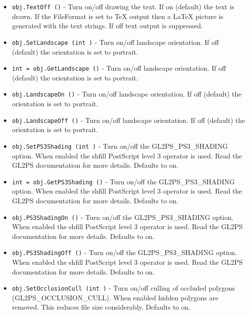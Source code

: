 \begin{itemize}
\item  \verb|obj.TextOff ()| -  Turn on/off drawing the text.  If on (default) the text is drawn.
 If the FileFormat is set to TeX output then a LaTeX picture is
 generated with the text strings.  If off text output is
 suppressed.

\item  \verb|obj.SetLandscape (int )| -  Turn on/off landscape orientation.  If off (default) the
 orientation is set to portrait.

\item  \verb|int = obj.GetLandscape ()| -  Turn on/off landscape orientation.  If off (default) the
 orientation is set to portrait.

\item  \verb|obj.LandscapeOn ()| -  Turn on/off landscape orientation.  If off (default) the
 orientation is set to portrait.

\item  \verb|obj.LandscapeOff ()| -  Turn on/off landscape orientation.  If off (default) the
 orientation is set to portrait.

\item  \verb|obj.SetPS3Shading (int )| -  Turn on/off the GL2PS\_PS3\_SHADING option.  When enabled the
 shfill PostScript level 3 operator is used.  Read the GL2PS
 documentation for more details.  Defaults to on.

\item  \verb|int = obj.GetPS3Shading ()| -  Turn on/off the GL2PS\_PS3\_SHADING option.  When enabled the
 shfill PostScript level 3 operator is used.  Read the GL2PS
 documentation for more details.  Defaults to on.

\item  \verb|obj.PS3ShadingOn ()| -  Turn on/off the GL2PS\_PS3\_SHADING option.  When enabled the
 shfill PostScript level 3 operator is used.  Read the GL2PS
 documentation for more details.  Defaults to on.

\item  \verb|obj.PS3ShadingOff ()| -  Turn on/off the GL2PS\_PS3\_SHADING option.  When enabled the
 shfill PostScript level 3 operator is used.  Read the GL2PS
 documentation for more details.  Defaults to on.

\item  \verb|obj.SetOcclusionCull (int )| -  Turn on/off culling of occluded polygons (GL2PS\_OCCLUSION\_CULL).
 When enabled hidden polygons are removed.  This reduces file size
 considerably.  Defaults to on.


\end{itemize}
